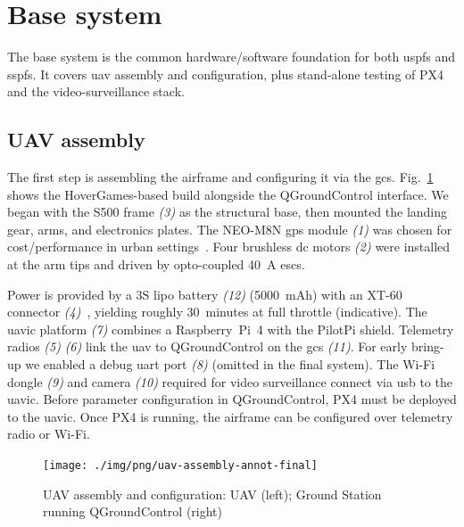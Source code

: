 \section{Base system}
\label{sec:base-system}
The base system is the common hardware/software foundation for both \gls{uspfs}
and \gls{sspfs}. It covers \gls{uav} assembly and configuration, plus
stand-alone testing of PX4 and the video-surveillance stack.

\subsection{UAV assembly}
\label{sec:uav-assembly}
The first step is assembling the airframe and configuring it via the \gls{gcs}.
Fig.~\ref{fig:uav-assembly} shows the HoverGames-based build alongside the
QGroundControl interface.
%
We began with the S500 frame \emph{(3)} as the structural base, then mounted the
landing gear, arms, and electronics plates. The NEO-M8N \gls{gps} module
\emph{(1)} was chosen for cost/performance in urban settings~\cite{gps-neom8n-product}.
Four brushless \gls{dc} motors \emph{(2)} were installed at the arm tips and
driven by opto-coupled 40~A \glspl{esc}.

Power is provided by a 3S \gls{lipo} battery \emph{(12)} (5000~mAh) with an
XT-60 connector \emph{(4)}~\cite{lipo-3s-uav}, yielding roughly 30~minutes at
full throttle (indicative). The \gls{uavic} platform \emph{(7)} combines a
Raspberry~Pi~4 with the PilotPi shield. Telemetry radios \emph{(5)} \emph{(6)}
link the \gls{uav} to QGroundControl on the \gls{gcs} \emph{(11)}. For early
bring-up we enabled a debug \gls{uart} port \emph{(8)} (omitted in the final
system). The Wi-Fi dongle \emph{(9)} and camera \emph{(10)} required for video
surveillance connect via \gls{usb} to the \gls{uavic}.
%
Before parameter configuration in QGroundControl, PX4 must be deployed to the
\gls{uavic}. Once PX4 is running, the airframe can be configured over telemetry
radio or Wi-Fi.

\begin{figure}[!hbt]
  \centering
  \texttt{[image: ./img/png/uav-assembly-annot-final]}
  \caption[UAV assembly and configuration]{UAV assembly and configuration: UAV
    (left); Ground Station running QGroundControl (right)}%
  \label{fig:uav-assembly}
\end{figure}

